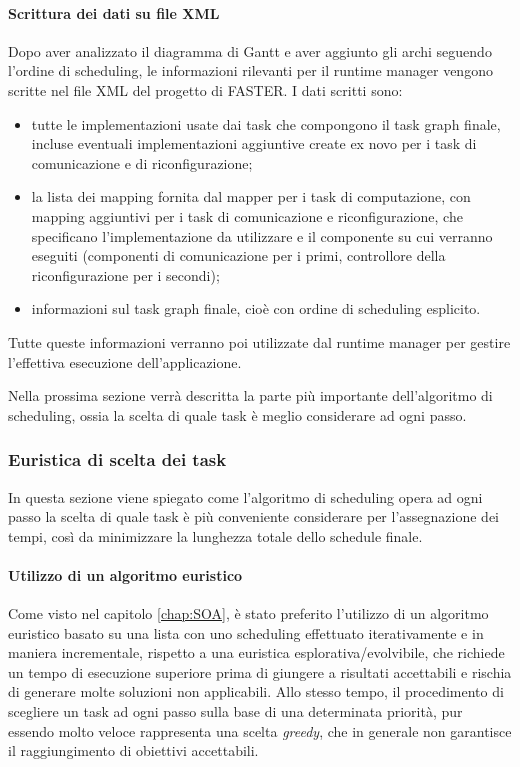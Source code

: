 \paragraph{Scrittura dei dati su file XML}
Dopo aver analizzato il diagramma di Gantt e aver aggiunto gli archi seguendo 
l'ordine di scheduling, le informazioni rilevanti per il runtime manager 
vengono scritte nel file XML del progetto di \ac{FASTER}. I dati scritti sono:
\begin{itemize}
 \item tutte le implementazioni usate dai task che compongono il task graph 
finale, incluse eventuali implementazioni aggiuntive create ex novo per i task di 
comunicazione e di riconfigurazione;
 \item la lista dei mapping fornita dal mapper per i task di computazione, con 
mapping aggiuntivi per i task di comunicazione e riconfigurazione, che 
specificano l'implementazione da utilizzare e il componente su cui verranno 
eseguiti (componenti di comunicazione per i primi, controllore della 
riconfigurazione per i secondi);
 \item informazioni sul task graph finale, cioè con ordine di scheduling 
esplicito.
\end{itemize}

Tutte queste informazioni verranno poi utilizzate dal runtime manager per 
gestire l'effettiva esecuzione dell'applicazione.

Nella prossima sezione verrà descritta la parte più importante dell'algoritmo 
di scheduling, ossia la scelta di quale task è meglio considerare ad ogni 
passo.


\subsubsection{Euristica di scelta dei task}
\label{subsec:euristicaSceltaTask}
In questa sezione viene spiegato come l'algoritmo di scheduling opera ad ogni 
passo la scelta di quale task è più conveniente considerare per l'assegnazione 
dei tempi, così da minimizzare la lunghezza totale dello schedule finale.

\paragraph{Utilizzo di un algoritmo euristico}
Come visto nel capitolo \ref{chap:SOA}, è stato preferito l'utilizzo di un 
algoritmo euristico basato su una lista con uno scheduling effettuato 
iterativamente e in maniera incrementale, rispetto a una euristica 
esplorativa/evolvibile, che richiede un tempo di esecuzione superiore prima di 
giungere a risultati accettabili e rischia di generare molte soluzioni non 
applicabili. Allo stesso tempo, il procedimento di scegliere un task ad ogni 
passo sulla base di una determinata priorità, pur essendo molto veloce 
rappresenta una scelta \emph{greedy}, che in generale non garantisce il 
raggiungimento di obiettivi accettabili.

